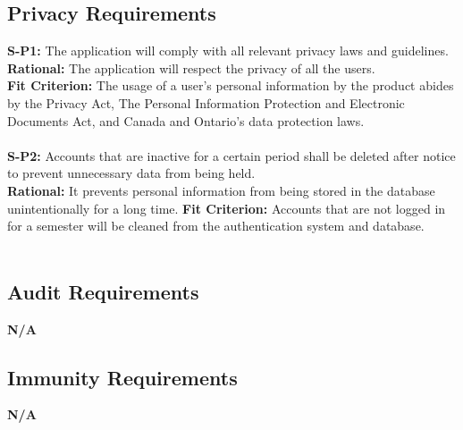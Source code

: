 \documentclass{article}
\begin{document}
\subsection{Privacy Requirements}
\textbf{S-P1:} The application will comply with all relevant privacy laws and guidelines.\\
\textbf{Rational:} The application will respect the privacy of all the users.\\
\textbf{Fit Criterion:} The usage of a user’s personal information by the product abides by the Privacy Act, The Personal Information Protection and Electronic Documents Act, and Canada and Ontario’s data protection laws.\\\\
\textbf{S-P2:} Accounts that are inactive for a certain period shall be deleted after notice to prevent unnecessary data from being held.\\
\textbf{Rational:} It prevents personal information from being stored in the database unintentionally for a long time.
\textbf{Fit Criterion:} Accounts that are not logged in for a semester will be cleaned from the authentication system and database.\\\\

\subsection{Audit Requirements}

\textbf{N/A}

\subsection{Immunity Requirements}

\textbf{N/A}
\end{document}
